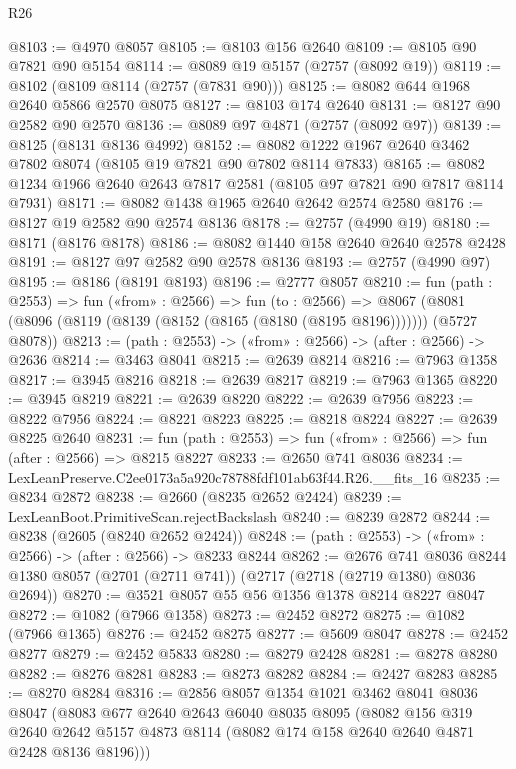 \begin{lexlean}{R26}
\begin{coremodule}
@8103 := @4970 @8057
@8105 := @8103 @156 @2640
@8109 := @8105 @90 @7821 @90 @5154
@8114 := @8089 @19 @5157 (@2757 (@8092 @19))
@8119 := @8102 (@8109 @8114 (@2757 (@7831 @90)))
@8125 := @8082 @644 @1968 @2640 @5866 @2570 @8075
@8127 := @8103 @174 @2640
@8131 := @8127 @90 @2582 @90 @2570
@8136 := @8089 @97 @4871 (@2757 (@8092 @97))
@8139 := @8125 (@8131 @8136 @4992)
@8152 := @8082 @1222 @1967 @2640 @3462 @7802 @8074 (@8105 @19 @7821 @90 @7802 @8114 @7833)
@8165 := @8082 @1234 @1966 @2640 @2643 @7817 @2581 (@8105 @97 @7821 @90 @7817 @8114 @7931)
@8171 := @8082 @1438 @1965 @2640 @2642 @2574 @2580
@8176 := @8127 @19 @2582 @90 @2574 @8136
@8178 := @2757 (@4990 @19)
@8180 := @8171 (@8176 @8178)
@8186 := @8082 @1440 @158 @2640 @2640 @2578 @2428
@8191 := @8127 @97 @2582 @90 @2578 @8136
@8193 := @2757 (@4990 @97)
@8195 := @8186 (@8191 @8193)
@8196 := @2777 @8057
@8210 := fun (path : @2553) =>
  fun («from» : @2566) =>
  fun (to : @2566) =>
  @8067 (@8081 (@8096 (@8119 (@8139 (@8152 (@8165 (@8180 (@8195 @8196))))))) (@5727 @8078))
@8213 := (path : @2553) -> («from» : @2566) -> (after : @2566) -> @2636
@8214 := @3463 @8041
@8215 := @2639 @8214
@8216 := @7963 @1358
@8217 := @3945 @8216
@8218 := @2639 @8217
@8219 := @7963 @1365
@8220 := @3945 @8219
@8221 := @2639 @8220
@8222 := @2639 @7956
@8223 := @8222 @7956
@8224 := @8221 @8223
@8225 := @8218 @8224
@8227 := @2639 @8225 @2640
@8231 := fun (path : @2553) => fun («from» : @2566) => fun (after : @2566) => @8215 @8227
@8233 := @2650 @741 @8036
@8234 := LexLeanPreserve.C2ee0173a5a920c78788fdf101ab63f44.R26.__fits_16
@8235 := @8234 @2872
@8238 := @2660 (@8235 @2652 @2424)
@8239 := LexLeanBoot.PrimitiveScan.rejectBackslash
@8240 := @8239 @2872
@8244 := @8238 (@2605 (@8240 @2652 @2424))
@8248 := (path : @2553) -> («from» : @2566) -> (after : @2566) -> @8233 @8244
@8262 := @2676
    @741
    @8036
    @8244
    @1380
    @8057
    (@2701 (@2711 @741))
    (@2717 (@2718 (@2719 @1380) @8036 @2694))
@8270 := @3521 @8057 @55 @56 @1356 @1378 @8214 @8227 @8047
@8272 := @1082 (@7966 @1358)
@8273 := @2452 @8272
@8275 := @1082 (@7966 @1365)
@8276 := @2452 @8275
@8277 := @5609 @8047
@8278 := @2452 @8277
@8279 := @2452 @5833
@8280 := @8279 @2428
@8281 := @8278 @8280
@8282 := @8276 @8281
@8283 := @8273 @8282
@8284 := @2427 @8283
@8285 := @8270 @8284
@8316 := @2856
    @8057
    @1354
    @1021
    @3462
    @8041
    @8036
    @8047
    (@8083
      @677
      @2640
      @2643
      @6040
      @8035
      @8095
      (@8082
        @156
        @319
        @2640
        @2642
        @5157
        @4873
        @8114
        (@8082 @174 @158 @2640 @2640 @4871 @2428 @8136 @8196)))

\end{coremodule}
\end{lexlean}
